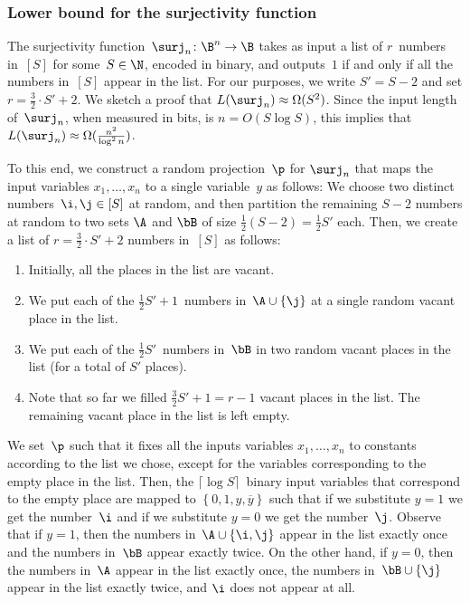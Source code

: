 \subsubsection{Lower bound for the surjectivity function}

The surjectivity function~$\surj_{n}\colon\B^{n}\to\B$ \cite{BM12} takes
as input a list of $r$~numbers in~$\left[S\right]$ for some~$S\in\N$,
encoded in binary, and outputs~$1$ if and only if all the numbers
in~$\left[S\right]$ appear in the list. For our purposes, we 
%
write %
$S'=S-2$ and set $r=\frac{3}{2}\cdot S'+2$. We sketch a proof that
$L(\surj_{n})\approx\Omega(S^{2})$. Since the input length of~$\surj_{n}$,
%
when measured in bits, is $n=O(S\log S)$, this implies that $L(\surj_{n})\approx\Omega(\frac{n^{2}}{\log^{2}n})$.

To this end, we construct a random projection~$\p$ for $\surj_{n}$
that maps the input variables $x_{1},\ldots,x_{n}$ to a single variable~$y$
as follows: We choose two distinct numbers~$\i,\j\in\left[S\right]$ at random,
and then partition the remaining $S-2$ numbers at random to two sets
$\A$ and $\bB$ of size $\frac{1}{2}(S-2)=\frac{1}{2}S'$ each. Then,
we create a list of $r=\frac{3}{2}\cdot S'+2$ numbers in~$\left[S\right]$
as follows:
\begin{enumerate}
\item Initially, all the places in the list are vacant.

\item We put each of the $\frac{1}{2}S'+1$~numbers in~$\A\cup\left\{ \j\right\} $
at a single random vacant place in the list.
\item We put each of the $\frac{1}{2}S'$~numbers in~$\bB$ in two random vacant
places in the list (for a total of $S'$ places).
\item Note that so far we filled $\frac{3}{2}S'+1=r-1$ vacant places in the list.
The remaining vacant place in the list is left empty.
\end{enumerate}
We set~$\p$ such that it fixes all the inputs variables $x_{1},\ldots,x_{n}$
to constants according to the list we chose, except for the variables
corresponding to the empty place in the list. Then, the $\lceil \log S \rceil$~binary input variables
that correspond to the empty place are mapped to $\left\{ 0,1,y,\overline{y}\right\} $
such that if we substitute $y=1$ we get the number~$\i$ and if
we substitute $y=0$ we get the number~$\j$. Observe that if $y=1$,
then the numbers in~$\A\cup\left\{ \i,\j\right\} $ appear in the
list exactly once and the numbers in~$\bB$ appear exactly twice.
On the other hand, if $y=0$, then the numbers in~$\A$ appear in
the list exactly once, the numbers in~$\bB\cup\left\{ \j\right\} $
appear in the list exactly twice, and $\i$ does not appear at all.

